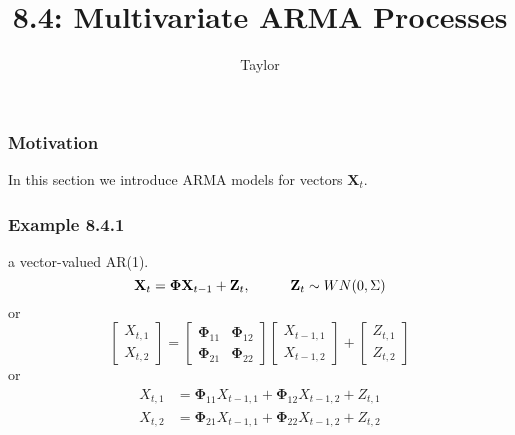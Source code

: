 \documentclass{beamer}
\title["8.4"]{8.4: Multivariate ARMA Processes}
\author{Taylor}
\institute[UVA] 
{
University of Virginia \\
\medskip
\textit{} 
}
\date{}
\begin{document}

\begin{frame}
\titlepage 
\end{frame}

\begin{frame}
\frametitle{Motivation}

In this section we introduce ARMA models for vectors $\mathbf{X}_t$.

\end{frame}


\begin{frame}
\frametitle{Example 8.4.1}

a vector-valued AR(1).
\[
\mathbf{X}_t = \bm{\Phi} \mathbf{X}_{t-1} + \mathbf{Z}_t, \hspace{10mm} \mathbf{Z}_t \sim WN(0,\Sigma)
\]
or
\[
\left[\begin{array}{c}
X_{t,1} \\
X_{t,2}
\end{array}\right] =
\left[\begin{array}{cc}
\bm{\Phi}_{11} & \bm{\Phi}_{12} \\
\bm{\Phi}_{21} & \bm{\Phi}_{22}
\end{array}\right]
\left[\begin{array}{c}
X_{t-1,1} \\
X_{t-1,2}
\end{array}\right]  +
\left[\begin{array}{c}
Z_{t,1} \\
Z_{t,2}
\end{array}\right] 
\]
or
\begin{align*}
X_{t,1} &= \bm{\Phi}_{11} X_{t-1,1} + \bm{\Phi}_{12} X_{t-1,2} + Z_{t,1} \\
X_{t,2} &= \bm{\Phi}_{21} X_{t-1,1} + \bm{\Phi}_{22} X_{t-1,2} + Z_{t,2} 
\end{align*}



\end{frame}



\end{document}
